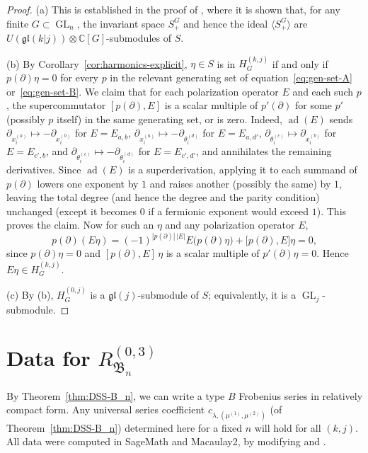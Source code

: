\documentclass[12pt]{amsart}
\theoremstyle{plain}
\theoremstyle{definition}
\DeclareMathOperator{\GL}{GL}
\DeclareMathOperator{\ad}{ad}
\newcommand{\C}{\mathbb{C}}
\begin{document}
\begin{proof}
    (a) This is established in the proof of \cite[Theorem 1.1]{Lentfer-Supersymmetry}, where it is shown that, for any finite $G \subset \GL_n$, the invariant space $S_+^G$ and hence the ideal $\langle S_+^G \rangle$ are $U(\mathfrak{gl}(k|j)) \otimes \C[G]$-submodules of $S$.

(b) By Corollary~\ref{cor:harmonics-explicit}, $\eta \in S$ is in $H_G^{(k,j)}$ if and only if $p(\partial)\eta = 0$ for every $p$ in the relevant generating set of equation~\eqref{eq:gen-set-A} or~\eqref{eq:gen-set-B}.
    We claim that for each polarization operator $E$ and each such $p$, the supercommutator $[p(\partial), E]$ is a scalar multiple of $p'(\partial)$ for some $p'$ (possibly $p$ itself) in the same generating set, or is zero.
    Indeed, $\ad(E)$ sends
    $\partial_{x_i^{(a)}} \mapsto -\partial_{x_i^{(b)}}$ for $E = E_{a,b}$,
    $\partial_{x_i^{(a)}} \mapsto -\partial_{\theta_i^{(d)}}$ for $E = E_{a,d'}$,
    $\partial_{\theta_i^{(c)}} \mapsto \partial_{x_i^{(b)}}$ for $E = E_{c',b}$, and
    $\partial_{\theta_i^{(c)}} \mapsto -\partial_{\theta_i^{(d)}}$ for $E = E_{c',d'}$,
    and annihilates the remaining derivatives. 
    Since $\ad(E)$ is a superderivation, applying it to each summand of $p(\partial)$ lowers one exponent by $1$ and raises another (possibly the same) by $1$, leaving the total degree (and hence the degree and the parity condition) unchanged (except it becomes $0$ if a fermionic exponent would exceed $1$).
    This proves the claim.
    Now for such an $\eta$ and any polarization operator $E$,
    \begin{equation}
        p(\partial) \left( E \eta \right)= (-1)^{|p(\partial)| \, |E|} E \big( p(\partial) \eta \big) + \big[ p(\partial), E \big] \eta = 0,
    \end{equation}
    since $p(\partial)\eta = 0$ and $[p(\partial), E]\,\eta$ is a scalar multiple of $p'(\partial)\eta = 0$.
    Hence $E\eta \in H_G^{(k,j)}$.

    (c) By (b), $H_G^{(0,j)}$ is a $\mathfrak{gl}(j)$-submodule of $S$; equivalently, it is a $\GL_j$-submodule.
\end{proof}


\section{Data for \texorpdfstring{$R_{\mathfrak{B}_n}^{(0,3)}$}{RBn(0,3)}}\label{sec:appendix}

By Theorem~\ref{thm:DSS-B_n}, we can write a type $B$ Frobenius series in relatively compact form. 
Any universal series coefficient $c_{\lambda,(\mu^{(1)},\mu^{(2)})}$ (of Theorem~\ref{thm:DSS-B_n}) determined here for a fixed $n$ will hold for all $(k,j)$.
All data were computed in SageMath and Macaulay2, by modifying \cite{Zabrocki-code} and  \cite{Bergeron-code}.
\end{document}
